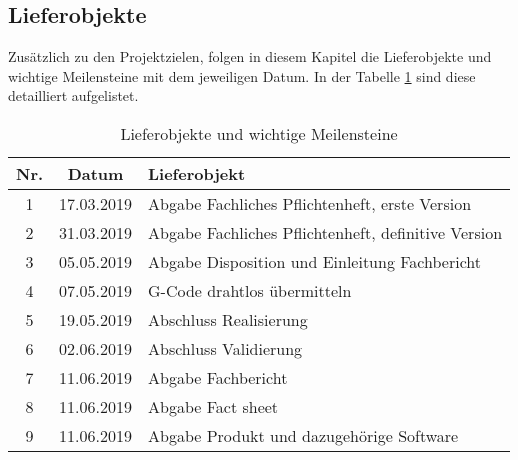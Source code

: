 \clearpage
\subsection{Lieferobjekte}\label{subsec:Lieferobjekte}
Zusätzlich zu den Projektzielen, folgen in diesem Kapitel die Lieferobjekte und wichtige Meilensteine mit dem jeweiligen Datum. In der Tabelle \ref{tbl:Lieferobjekte} sind diese detailliert aufgelistet.  


\begin{table}[H]
     \centering
\begin{tabular}{|c|c|l|}\hline
   \textbf{Nr.} & \textbf{Datum} & \textbf{Lieferobjekt} \\ \hline
   1 & 17.03.2019 & Abgabe Fachliches Pflichtenheft, erste Version \\ \hline 
   2 & 31.03.2019 & Abgabe Fachliches Pflichtenheft, definitive Version \\ \hline
   3 & 05.05.2019 & Abgabe Disposition und Einleitung Fachbericht \\ \hline
   4 & 07.05.2019 & G-Code drahtlos übermitteln \\ \hline   
   5 & 19.05.2019 & Abschluss Realisierung \\ \hline   
   6 & 02.06.2019 & Abschluss Validierung \\ \hline   
   7 & 11.06.2019 & Abgabe Fachbericht \\ \hline
   8 & 11.06.2019 & Abgabe Fact sheet \\ \hline
   9 & 11.06.2019 & Abgabe Produkt und dazugehörige Software \\ \hline   
   
 \end{tabular}
     \caption{Lieferobjekte und wichtige Meilensteine}
     \label{tbl:Lieferobjekte}
\end{table}








